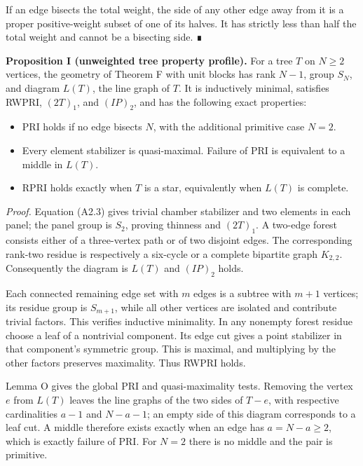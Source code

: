 \documentclass[
  10pt,
  letterpaper,
]{article}
\newcounter{none} %
\providecommand{\tightlist}{%
  \setlength{\itemsep}{0pt}\setlength{\parskip}{0pt}}
\begin{document}
If an edge bisects the total weight, the side of any other edge away
from it is a proper positive-weight subset of one of its halves. It has
strictly less than half the total weight and cannot be a bisecting side.
∎

\textbf{Proposition I (unweighted tree property profile).} For a tree
\(T\) on \(N\geq2\) vertices, the geometry of Theorem F with unit blocks
has rank \(N-1\), group \(S_N\), and diagram \(L(T)\), the line graph of
\(T\). It is inductively minimal, satisfies RWPRI, \((2T)_1\), and
\((IP)_2\), and has the following exact properties:

\begin{itemize}
\tightlist
\item
  PRI holds if no edge bisects \(N\), with the additional primitive case
  \(N=2\).
\item
  Every element stabilizer is quasi-maximal. Failure of PRI is
  equivalent to a middle in \(L(T)\).
\item
  RPRI holds exactly when \(T\) is a star, equivalently when \(L(T)\) is
  complete.
\end{itemize}

\emph{Proof.} Equation (A2.3) gives trivial chamber stabilizer and two
elements in each panel; the panel group is \(S_2\), proving thinness and
\((2T)_1\). A two-edge forest consists either of a three-vertex path or
of two disjoint edges. The corresponding rank-two residue is
respectively a six-cycle or a complete bipartite graph \(K_{2,2}\).
Consequently the diagram is \(L(T)\) and \((IP)_2\) holds.

Each connected remaining edge set with \(m\) edges is a subtree with
\(m+1\) vertices; its residue group is \(S_{m+1}\), while all other
vertices are isolated and contribute trivial factors. This verifies
inductive minimality. In any nonempty forest residue choose a leaf of a
nontrivial component. Its edge cut gives a point stabilizer in that
component's symmetric group. This is maximal, and multiplying by the
other factors preserves maximality. Thus RWPRI holds.

Lemma O gives the global PRI and quasi-maximality tests. Removing the
vertex \(e\) from \(L(T)\) leaves the line graphs of the two sides of
\(T-e\), with respective cardinalities \(a-1\) and \(N-a-1\); an empty
side of this diagram corresponds to a leaf cut. A middle therefore
exists exactly when an edge has \(a=N-a\geq2\), which is exactly failure
of PRI. For \(N=2\) there is no middle and the pair is primitive.
\end{document}
